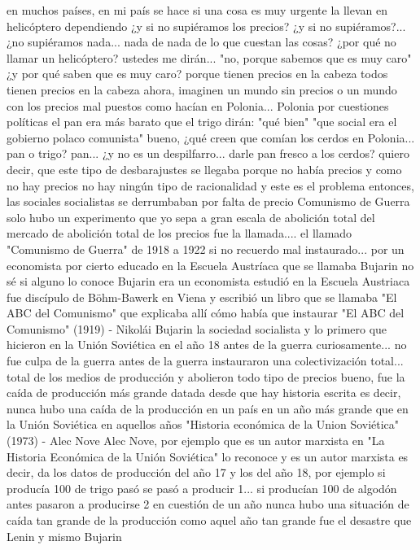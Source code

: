 en muchos países, en mi país se hace si una cosa es muy urgente la llevan en helicóptero dependiendo ¿y si no supiéramos los precios?
¿y si no supiéramos?... ¿no supiéramos nada... nada de nada de lo que cuestan las cosas?
¿por qué no llamar un helicóptero? ustedes me dirán... "no, porque sabemos que es muy caro"
¿y por qué saben que es muy caro? porque tienen precios en la cabeza todos tienen precios en la cabeza
ahora, imaginen un mundo sin precios o un mundo con los precios mal puestos
como hacían en Polonia... Polonia por cuestiones políticas el pan
era más barato que el trigo dirán: "qué bien" "que social era el gobierno polaco comunista" bueno, ¿qué creen que comían los cerdos en Polonia...
pan o trigo? pan... ¿y no es un despilfarro...
darle pan fresco a los cerdos? quiero decir, que este tipo de desbarajustes se llegaba
porque no había precios y como no hay precios no hay ningún tipo de racionalidad
y este es el problema entonces, las sociales socialistas se derrumbaban por falta de precio
Comunismo de Guerra
solo hubo un experimento que yo sepa a gran escala de abolición total del mercado
de abolición total de los precios fue la llamada.... el llamado "Comunismo de Guerra" de 1918 a 1922 si no recuerdo mal
instaurado... por un economista por cierto educado en la Escuela Austríaca que se llamaba Bujarin no sé si alguno lo conoce
Bujarin era un economista estudió en la Escuela Austriaca fue discípulo de Böhm-Bawerk en Viena
y escribió un libro que se llamaba "El ABC del Comunismo" que explicaba allí cómo había que instaurar
"El ABC del Comunismo" (1919) - Nikolái Bujarin
la sociedad socialista y lo primero que hicieron en la Unión Soviética en el año 18 antes de la guerra curiosamente...
no fue culpa de la guerra antes de la guerra instauraron una colectivización total... total
de los medios de producción y abolieron todo tipo de precios bueno, fue la caída de producción
más grande datada desde que hay historia escrita es decir, nunca hubo una caída
de la producción en un país en un año más grande que en la Unión Soviética en aquellos años
"Historia económica de la Union Soviética" (1973) - Alec Nove
Alec Nove, por ejemplo que es un autor marxista en "La Historia Económica de la Unión Soviética" lo reconoce y es un autor marxista es decir, da los datos de producción del año 17
y los del año 18, por ejemplo si producía 100 de trigo pasó se pasó a producir 1... si producían 100 de algodón antes
pasaron a producirse 2 en cuestión de un año nunca hubo una situación de caída tan grande
de la producción como aquel año tan grande fue el desastre que Lenin y mismo Bujarin
